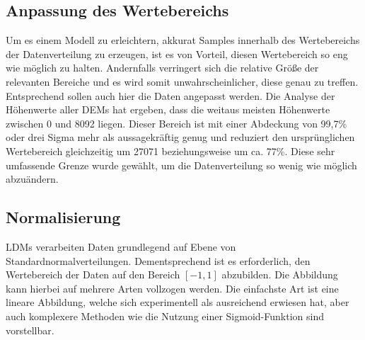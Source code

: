 \subsection{Anpassung des Wertebereichs}

Um es einem Modell zu erleichtern, akkurat Samples innerhalb des Wertebereichs der Datenverteilung zu erzeugen, ist es von Vorteil, diesen Wertebereich so eng wie möglich zu halten. Andernfalls verringert sich die relative Größe der relevanten Bereiche und es wird somit unwahrscheinlicher, diese genau zu treffen. Entsprechend sollen auch hier die Daten angepasst werden. 
Die Analyse der Höhenwerte aller DEMs hat ergeben, dass die weitaus meisten Höhenwerte zwischen 0 und 8092 liegen. Dieser Bereich ist mit einer Abdeckung von 99,7\% oder drei Sigma mehr als aussagekräftig genug und reduziert den ursprünglichen Wertebereich gleichzeitig um 27071 beziehungsweise um ca. 77\%. 
Diese sehr umfassende Grenze wurde gewählt, um die Datenverteilung so wenig wie möglich abzuändern.

\subsection{Normalisierung}

\ac{LDM}s verarbeiten Daten grundlegend auf Ebene von Standardnormalverteilungen. Dementsprechend ist es erforderlich, den Wertebereich der Daten auf den Bereich $\left [ -1, 1\right ]$ abzubilden. Die Abbildung kann hierbei auf mehrere Arten vollzogen werden. Die einfachste Art ist eine lineare Abbildung, welche sich experimentell als ausreichend erwiesen hat, aber auch komplexere Methoden wie die Nutzung einer Sigmoid-Funktion sind vorstellbar. 


